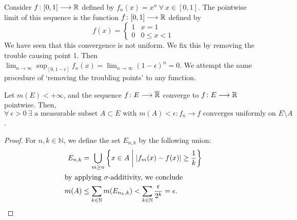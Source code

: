 \documentclass[a4paper]{book}
\begin{document}
Consider $f\colon [0,1] \longrightarrow \mathbb{R}$ defined by $f_n(x) = x^n\ \forall\ x \in [0,1].$ The pointwise limit of this sequence is the function $f\colon[0,1]\longrightarrow \mathbb{R}$ defined by \[f(x) = \begin{cases} 1 & x=1 \\ 0 & 0\leq x< 1 \end{cases}\]
We have seen that this convergence is not uniform. We fix this by removing the trouble causing point 1. Then $\displaystyle \lim_{n \to \infty} \sup_{[0, 1-\epsilon]} f_n(x) = \lim_{n \to \infty} (1-\epsilon)^n = 0$. We attempt the same procedure of `removing the troubling points' to any function.
\begin{theorem}
Let $m(E) < +\infty$, and the sequence $f\colon E \longrightarrow \overline{\mathbb{R}}$ converge to $f\colon E \longrightarrow \mathbb{R}$ pointwise. Then, $\forall\ \epsilon>0\ \exists \text{ a measurable subset } A \subset E \text{ with } m(A) < \epsilon : f_n \longrightarrow f \text{ converges uniformly on } E\setminus A$.
\begin{proof}
For $n,k \in \mathbb{N}$, we define the set $E_{n,k}$ by the following union:
\begin{align*}
E_{n,k} &= \bigcup_{m\geq n} \qty{x \in A \biggm| |f_m(x) - f(x)| \geq \dfrac{1}{k}} \\
\intertext{by applying $\sigma$-additivity, we conclude}
m(A) &\leq \sum_{k \in \mathbb{N}} m(E_{n_k,k}) < \sum_{k \in \mathbb{N}} \frac{\epsilon}{2^k} = \epsilon.
\end{align*}
\end{proof}
\end{theorem}
\newpage
\end{document}
